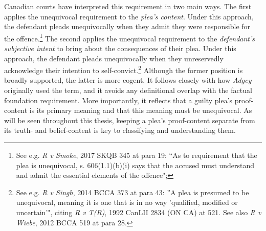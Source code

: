 Canadian courts have interpreted this requirement in two main ways. The first applies the unequivocal requirement to the \textit{plea's content}. Under this approach, the defendant pleads unequivocally when they admit they were responsible for the offence.\footnote{See e.g. \textit{R v Smoke}, 2017 SKQB 345 at para 19: ``As to requirement that the plea is unequivocal, s. 606(1.1)(b)(i) says that the accused must understand and admit the essential elements of the offence"; } The second applies the unequivocal requirement to the \textit{defendant's subjective intent} to bring about the consequences of their plea. Under this approach, the defendant pleads unequivocally when they unreservedly acknowledge their intention to self-convict.\footnote{See e.g. \textit{R v Singh}, 2014 BCCA 373 at para 43: ''A plea is presumed to be unequivocal, meaning it is one that is in no way 'qualified, modified or uncertain'", citing \textit{R v T(R)}, 1992 CanLII 2834 (ON CA) at 521. See also \textit{R v Wiebe}, 2012 BCCA 519 at para 28.} Although the former position is broadly supported, the latter is more cogent. It follows closely with how \textit{Adgey} originally used the term, and it avoids any definitional overlap with the factual foundation requirement. More importantly, it reflects that a guilty plea's proof-content is its primary meaning and that this meaning must be unequivocal. As will be seen throughout this thesis, keeping a plea's proof-content separate from its truth- and belief-content is key to classifying and understanding them.